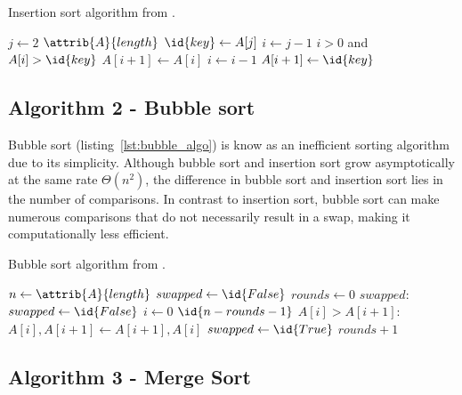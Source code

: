 \documentclass[sigconf, nonacm, natbib, screen, balance=False]{acmart}
\begin{document}
\begin{listing}
  \caption{Insertion sort algorithm from \citet[Ch.~2.1]{CLRS_2009}.}
  \label{lst:insertion_algo}

  \begin{codebox}
    \li \For $j \gets 2$ \To $\attrib{A}{length}$
    \li \Do
    $\id{key} \gets A[j]$
    \li     $i \gets j-1$
    \li      \While $i>0$ and $A[i] > \id{key}$
    \li      \Do
    $A[i+1] \gets A[i]$
    \li         $i \gets i-1$
    \End    
    \li       $A[i+1]\gets \id{key}$
    \End
  \end{codebox}
\end{listing}

\subsection{Algorithm 2 - Bubble sort}\label{sec:algo2}

Bubble sort (listing~\ref{lst:bubble_algo}) is know as an inefficient sorting algorithm due to its simplicity. Although bubble sort and insertion sort  grow asymptotically at the same rate $\Theta(n^2)$, the difference in bubble sort and insertion sort lies in the number of comparisons. In contrast to insertion sort, bubble sort can make numerous comparisons that do not necessarily result in a swap, making it computationally less efficient.

\begin{listing}
  \caption{Bubble sort algorithm from \citet[Ch.~2.1]{CLRS_2009}.}
  \label{lst:bubble_algo}

  \begin{codebox}
    \li $n \gets \attrib{A}{length}$
    \li $swapped \gets \id{False}$
    \li $rounds \gets 0$
    \li \While $swapped:$
    \li \Do
    $swapped \gets \id{False}$
    \li \For $i \gets 0 $ \To $\id{n - rounds - 1}$
    \li     \Do
    \If $A[i] > A[i+1]:$
    \li     \Do
    $A[i], A[i+1] \gets A[i+1], A[i]$
    \li $swapped \gets \id{True}$
    \End
    \End    
    \li       $rounds + 1$
    \End
  \end{codebox}
\end{listing}


\subsection{Algorithm 3 - Merge Sort}\label{sec:algo2}
\end{document}
